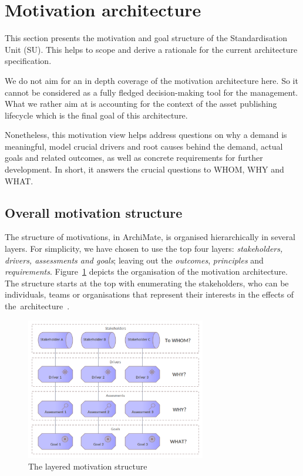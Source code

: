 \section{Motivation architecture}
\label{sec:motivation-architecture}

	This section presents the motivation and goal structure of the Standardisation Unit (SU). This helps to scope and derive a rationale for the current architecture specification. 
	
	We do not aim for an in depth coverage of the motivation architecture here. So it cannot be considered as a fully fledged decision-making tool for the management. What we rather aim at is accounting for the context of the asset publishing lifecycle which is the final goal of this architecture. 
	
	Nonetheless, this motivation view helps address questions on why a demand is meaningful, model crucial drivers and root causes behind the demand, actual goals and related outcomes, as well as concrete requirements for further development. In short, it answers the crucial questions to WHOM, WHY and WHAT.
	
	\subsection{Overall motivation structure}
	\label{sec:how-to-motivation}		
	
	The structure of motivations, in ArchiMate, is organised hierarchically in several layers. For simplicity, we have chosen to use the top four layers: \textit{stakeholders, drivers, assessments and goals}; leaving out the \textit{outcomes}, \textit{principles} and \textit{requirements}. \mbox{Figure \ref{fig:morivation-structure}} depicts the organisation of the motivation architecture. The structure starts at the top with enumerating the stakeholders, who can be individuals, teams or organisations that represent their interests in the effects of \mbox{the architecture \citep{archimate3.1}}. 
	
	\begin{figure}[h]
		\centering
		\includegraphics[width=0.7\textwidth]{images/views/Motivation view.png}
		\caption{The layered motivation structure}
		\label{fig:morivation-structure}
	\end{figure}
	

